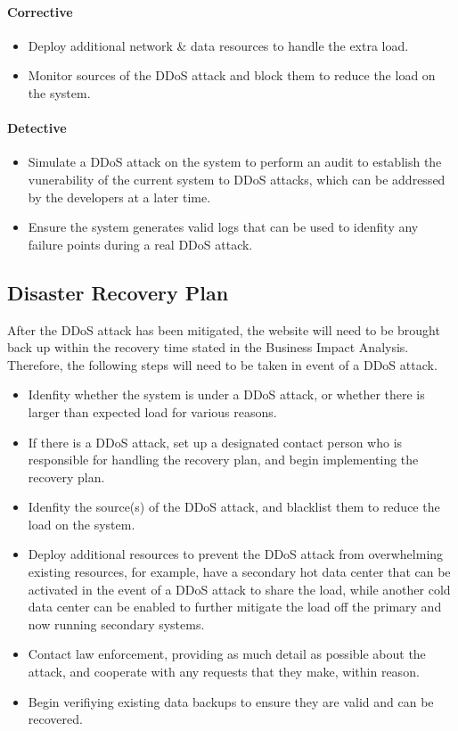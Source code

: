 \documentclass[12pt,a4paper]{article}
\begin{document}
\paragraph{Corrective}
\begin{itemize}
\item Deploy additional network \& data resources to handle the extra load.
  \item Monitor sources of the DDoS attack and block them to reduce the load on the system.
\end{itemize}

\paragraph{Detective}
\begin{itemize}
\item Simulate a DDoS attack on the system to perform an audit to establish the vunerability of the current system to DDoS attacks, which can be addressed by the developers at a later time.
\item Ensure the system generates valid logs that can be used to idenfity any failure points during a real DDoS attack.
\end{itemize}

\subsection{Disaster Recovery Plan}
After the DDoS attack has been mitigated, the website will need to be brought back up within the recovery time stated in the Business Impact Analysis. Therefore, the following steps will need to be taken in event of a DDoS attack.

\begin{itemize}
  \item Idenfity whether the system is under a DDoS attack, or whether there is larger than expected load for various reasons.
  \item If there is a DDoS attack, set up a designated contact person who is responsible for handling the recovery plan, and begin implementing the recovery plan.
  \item Idenfity the source(s) of the DDoS attack, and blacklist them to reduce the load on the system.
  \item Deploy additional resources to prevent the DDoS attack from overwhelming existing resources, for example, have a secondary hot data center that can be activated in the event of a DDoS attack to share the load, while another cold data center can be enabled to further mitigate the load off the primary and now running secondary systems.
  \item Contact law enforcement, providing as much detail as possible about the attack, and cooperate with any requests that they make, within reason.
    \item Begin verifiying existing data backups to ensure they are valid and can be recovered.
\end{itemize}
\end{document}
